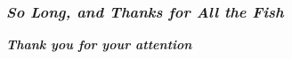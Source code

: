 \begin{frame}
  \frametitle{ \textit{So Long, and Thanks for All the Fish}}
  \begin{center}
    \Huge
    \textbf{\textit{
      Thank you for your attention\\
    }}
  \end{center}
\end{frame}
